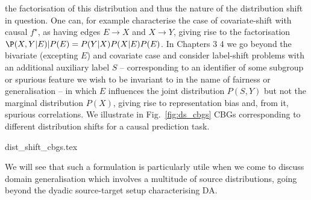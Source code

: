the factorisation of this distribution and thus the nature of the distribution shift in question.
%
One can, for example characterise the case of covariate-shift with causal \(f^\star\), as having
edges  \(E \to X\) and \( X \to Y \), giving rise to the factorisation \( \P(X, Y | E) | P(E) =
P(Y|X)P(X|E)P(E) \). 
%
In Chapters 3 4 we go beyond the bivariate (excepting \(E\)) and covariate case and consider
label-shift problems with an additional auxiliary label \(S\) -- corresponding to an identifier of
some subgroup or spurious feature we wish to be invariant to in the name of fairness or
generalisation --  in which \(E\) influences the joint distribution \(P(S, Y)\) but not the
marginal distribution \(P(X)\), giving rise to representation bias and, from it, spurious
correlations.
%
We illustrate in Fig.~\ref{fig:ds_cbgs} CBGs corresponding to different distribution shifts for a
causal prediction task.
%

{dist_shift_cbgs.tex}

%
We will see that such a formulation is particularly utile when we come to discuss domain
generalisation which involves a multitude of source distributions, going beyond the dyadic
source-target setup characterising DA.

